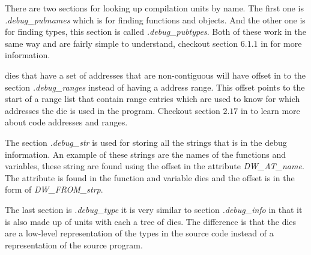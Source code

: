 There are two sections for looking up compilation units by name.
The first one is \emph{.debug\_pubnames} which is for finding functions and objects.
And the other one is for finding types, this section is called \emph{.debug\_pubtypes}.
Both of these work in the same way and are fairly simple to understand, checkout section $6.1.1$ in \cite{dwarf} for more information.


\Glspl{die} that have a set of addresses that are non-contiguous will have offset in to the section \emph{.debug\_ranges} instead of having a address range.
This offset points to the start of a range list that contain range entries which are used to know for which addresses the \gls{die} is used in the program.
Checkout section $2.17$ in \cite{dwarf} to learn more about code addresses and ranges.


The section \emph{.debug\_str} is used for storing all the strings that is in the debug information.
An example of these strings are the names of the functions and variables, these string are found using the offset in the attribute \emph{DW\_AT\_name}.
The attribute is found in the function and variable dies and the offset is in the form of \emph{DW\_FROM\_strp}.


The last section is \emph{.debug\_type} it is very similar to section \emph{.debug\_info} in that it is also made up of units with each a \gls{tree} of \glspl{die}.
The difference is that the \glspl{die} are a low-level representation of the types in the source code instead of a representation of the source program.

